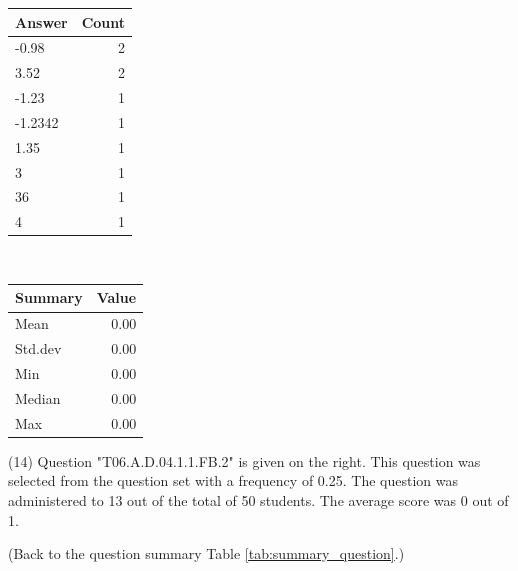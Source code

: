 \documentclass[12pt,english,nohyper]{tufte-handout}\usepackage[]{graphicx}\usepackage[]{color}
\begin{document}
\begin{center}%
\begin{tabular}{lr}
  \hline
Answer & Count \\ 
  \hline
-0.98 &   2 \\ 
  3.52 &   2 \\ 
  -1.23 &   1 \\ 
  -1.2342 &   1 \\ 
  1.35 &   1 \\ 
  3 &   1 \\ 
  36 &   1 \\ 
  4 &   1 \\ 
   \hline
\end{tabular}
~~~~~~~~%
\begin{tabular}{lr}
  \hline
Summary & Value \\ 
  \hline
Mean & 0.00 \\ 
  Std.dev & 0.00 \\ 
  Min & 0.00 \\ 
  Median & 0.00 \\ 
  Max & 0.00 \\ 
   \hline
\end{tabular}
\end{center}\newpage{} (14) Question "T06.A.D.04.1.1.FB.2" is given on the right. This question was selected from the question set with a frequency of 0.25. The question was administered to 13 out of the total of 50 students. The average score was 0 out of 1.

 (Back to the question summary Table \ref{tab:summary_question}.)
\end{document}
